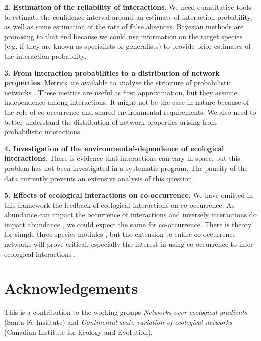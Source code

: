 \documentclass[12pt]{article}
\begin{document}
\textbf{2. Estimation of the reliability of interactions}. We need quantitative tools
to estimate the confidence interval around an estimate of interaction
probability, as well as some estimation of the rate of false absences.
Bayesian methods are promising to that end because we could use information on
the target species (e.g. if they are known as specialists or generalists) to
provide prior estimates of the interaction probability.

\textbf{3. From interaction probabilities to a distribution of network properties}.
Metrics are available to analyse the structure of probabilistic networks
\citep{Poisot2015c}. These metrics are useful as first approximation, but they
assume independence among interactions. It might not be the case in nature
because of the role of co-occurrence and shared environmental requirements. We
also need to better understand the distribution of network properties arising
from probabilistic interactions.

\textbf{4. Investigation of the environmental-dependence of ecological interactions}.
There is evidence that interactions can vary in space, but this problem has
not been investigated in a systematic program. The paucity of the data
currently prevents an extensive analysis of this question.

\textbf{5. Effects of ecological interactions on co-occurrence}. We have omitted in
this framework the feedback of ecological interactions on co-occurrence. As
abundance can impact the occurrence of interactions and inversely interactions
do impact abundance \citep{Canard2014}, we could expect the same for co-occurrence.
There is theory for simple three species modules \citep{Cazelles20157}, but the
extension to entire co-occurrence networks will prove critical, especially the
interest in using co-occurrence to infer ecological interactions \citep{Morales2015,
Morueta-Holme2016}.

\section*{Acknowledgements}
This is a contribution to the working groups \emph{Networks over ecological
gradients} (Santa Fe Institute) and \emph{Continental-scale variation of
ecological networks} (Canadian Institute for Ecology and Evolution). 
\newpage


\end{document}
